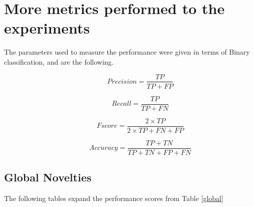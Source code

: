 \clearpage

\section{More metrics performed to the experiments}

\label{metrics}

The parameters used to measure the performance were given in terms of Binary classification, and are the following.

\begin{description}
\item[]

\begin{equation}
Precision = \dfrac{TP}{ TP + FP}
\end{equation}

\item[]

\begin{equation}
Recall = \dfrac{TP}{TP + FN}
\end{equation}

\item[]

\begin{equation}
F score = \dfrac{2 \times TP}{2 \times TP+FN+FP}
\end{equation}

\item[]

\begin{equation}
Accuracy = \dfrac{TP + TN}{TP + TN + FP + FN}
\end{equation}

\end{description}

\subsection{Global Novelties}

The following tables expand the performance scores from Table \ref{global}

